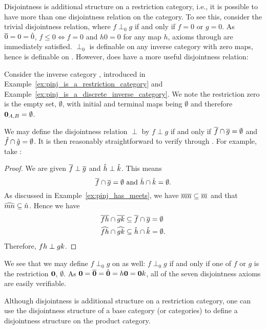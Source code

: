 Disjointness is additional structure on a restriction category, i.e., it is possible to have more
than one disjointness relation on the category. To see this, consider the trivial disjointness
relation, where $f \perp_0 g$ if and only if $f = 0$ or $g = 0$. As $\overline{0} = 0 = \hat{0}$, $f \le 0
\iff f = 0$ and $h 0 =0$ for any map $h$, axioms  through  are
immediately satisfied. $\perp_0$ is definable on any inverse category with zero maps, hence is
definable on \pinj. However, \pinj does have a more useful disjointness relation:
\begin{example}\label{ex:pinj_has_a_disjointness_relation}
  Consider the inverse category \pinj, introduced in Example~\ref{ex:pinj_is_a_restriction_category}
  and Example~\ref{ex:pinj_is_a_discrete_inverse_category}.
  We note the restriction zero is the empty set, $\emptyset$, with initial and terminal maps being
  $\emptyset$ and therefore $\mathbf{0}_{A,B} = \emptyset$.

  We may define the disjointness relation $\perp$ by $f \perp g$ if and only if
  $\overline{f}\cap\overline{g}=\emptyset$ and $\hat{f}\cap\hat{g} = \emptyset$. It is then
  reasonably straightforward to verify  through . For example, take
  :
  \begin{proof}
    We are given $\overline{f}\perp\overline{g}$ and $\hat{h}\perp\hat{k}$. This means
    \[
      \overline{f}\cap\overline{g}=\emptyset \text{ and }\hat{h}\cap\hat{k} = \emptyset.
    \]
    As discussed in Example~\ref{ex:pinj_has_meets}, we have
    $\overline{m n} \subseteq \overline{m}$ and that $\widehat{m n} \subseteq \hat{n}$. Hence we have
    \begin{align*}
      \overline{f h}\cap\overline{g k}&\subseteq \overline{f}\cap \overline{g}= \emptyset\\
      \widehat{f h}\cap\widehat{g k}&\subseteq \hat{h}\cap \hat{k}= \emptyset.
    \end{align*}
    Therefore, $f h \perp g k$.
  \end{proof}

  We see that we may define $f \perp_0 g$ on \pinj as well: $f \perp_0 g$ if and only if one of $f$
  or $g$ is the restriction $\mathbf{0}$, $\emptyset$. As $\mathbf{0} = \overline{\mathbf{0}} = \hat{\mathbf{0}} = h
  \mathbf{0} = \mathbf{0} k$, all of the seven disjointness axioms are easily verifiable.
\end{example}

Although disjointness is additional structure on a restriction category, one can use the
disjointness structure of a base category (or categories) to define a disjointness structure
on the product category.

